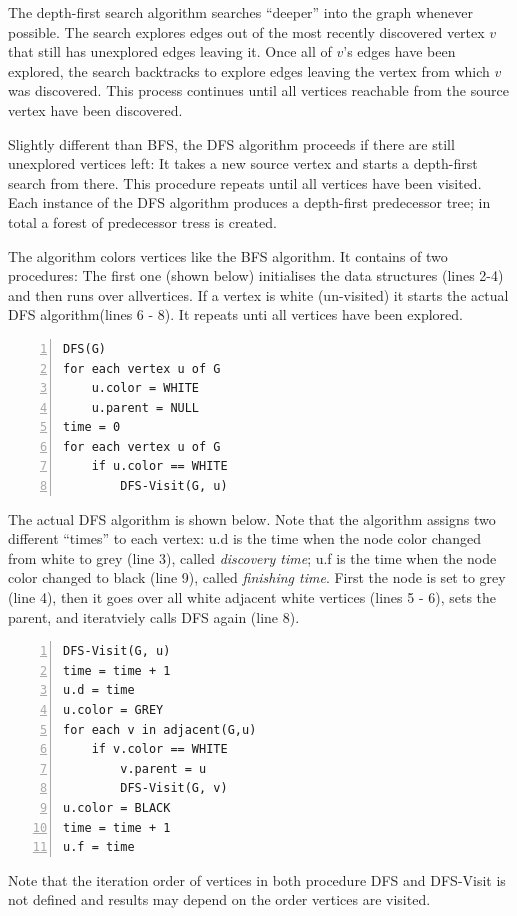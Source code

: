 
The depth-first search algorithm searches ``deeper'' into the graph whenever possible. The search explores edges out of the most recently discovered vertex $v$ that still has unexplored edges leaving it. Once all of $v$'s edges have been explored, the search backtracks to explore edges leaving the vertex from which $v$ was discovered. This process continues until all vertices reachable from the source vertex have been discovered.

Slightly different than BFS, the DFS algorithm proceeds if there are still unexplored vertices left: It takes a new source vertex and starts a depth-first search from there. This procedure repeats until all vertices have been visited. Each instance of the DFS algorithm produces a depth-first predecessor tree; in total a forest of predecessor tress is created.

The algorithm colors vertices like the BFS algorithm. It contains of two procedures: The first one (shown below) initialises the data structures (lines 2-4) and then runs over allvertices. If a vertex is white (un-visited) it starts the actual DFS algorithm(lines 6 - 8). It repeats unti all vertices have been explored.

\begin{Verbatim}[numbers=left, xleftmargin=5mm]
DFS(G)
for each vertex u of G
    u.color = WHITE
    u.parent = NULL
time = 0
for each vertex u of G
    if u.color == WHITE
        DFS-Visit(G, u)
\end{Verbatim}

The actual DFS algorithm is shown below. Note that the algorithm assigns two different ``times'' to each vertex: u.d is the time when the node color changed from white to grey (line 3), called \emph{discovery time}; u.f is the time when the node color changed to black (line 9), called \emph{finishing time}. First the node is set to grey (line 4), then it goes over all white adjacent white vertices (lines 5 - 6), sets the parent, and iteratviely calls DFS again (line 8).

\begin{Verbatim}[numbers=left, xleftmargin=5mm]
DFS-Visit(G, u)
time = time + 1
u.d = time
u.color = GREY
for each v in adjacent(G,u)
    if v.color == WHITE
        v.parent = u
        DFS-Visit(G, v)
u.color = BLACK
time = time + 1
u.f = time
\end{Verbatim}

Note that the iteration order of vertices in both procedure DFS and DFS-Visit is not defined and results may depend on the order vertices are visited.

